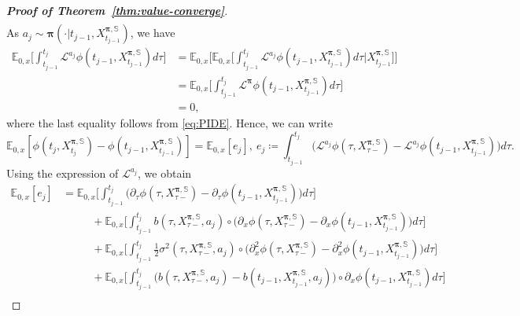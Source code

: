 \documentclass[11pt]{article}
\newcommand{\1}{\mathbbm{1}}
\newcommand{\bpi}{\boldsymbol{\pi}}
\begin{document}
\begin{proof}[\bf Proof of Theorem~\ref{thm:value-converge}]
\begin{align*}
\end{align*}
As $a_j\sim\bpi(\cdot|t_{j-1}, X^{\bpi, \mathbb{S}}_{t_{j-1}})$, we have
\begin{align}
	\mathbb{E}_{0,x}\Big[\int_{t_{j-1}}^{t_j}\mathcal{L}^{a_j}\phi(t_{j-1}, X_{t_{j-1}}^{\bpi, \mathbb{S}})d\tau\Big] &= \mathbb{E}_{0,x}\Big[\mathbb{E}_{0,x}\Big[\int_{t_{j-1}}^{t_j}\mathcal{L}^{a_j}\phi(t_{j-1}, X_{t_{j-1}}^{\bpi, \mathbb{S}})d\tau\Big|X_{t_{j-1}}^{\bpi, \mathbb{S}}\Big]\Big]\\
	&= \mathbb{E}_{0,x}\Big[\int_{t_{j-1}}^{t_j}\mathcal{L}^{\bpi} \phi(t_{j-1}, X_{t_{j-1}}^{\bpi,\mathbb{S}})d\tau\Big]\\
	&=0,
\end{align}
where the last equality follows from \eqref{eq:PIDE}. Hence, we can write
\begin{equation}
 \mathbb{E}_{0,x}[\phi(t_j, X_{t_j}^{\bpi , \mathbb{S}}) - \phi(t_{j-1}, X_{t_{j-1}}^{\bpi, \mathbb{S}})] =  \mathbb{E}_{0,x}[e_j],\  e_j\coloneqq\int_{t_{j-1}}^{t_j}
 \big(\mathcal{L}^{a_j} \phi(\tau , X_{\tau-}^{\bpi, \mathbb{S}}) -  \mathcal{L}^{a_j} \phi(t_{j-1}, X_{t_{j-1}}^{\bpi, \mathbb{S}})\big)d\tau.
\end{equation}
Using the expression of $\mathcal{L}^{a_j}$, we obtain
\begin{align}
\mathbb{E}_{0,x}[e_j]&=\mathbb{E}_{0,x}\Big[\int_{t_{j-1}}^{t_j}\big(\partial_{\tau}\phi(\tau, X_{\tau-}^{\bpi, \mathbb{S}})-\partial_{\tau}\phi(t_{j-1}, X_{t_{j-1}}^{\bpi, \mathbb{S}})\big)d\tau\Big]\\
&\phantom{==}+\mathbb{E}_{0,x}\Big[\int_{t_{j-1}}^{t_j}b(\tau, X_{\tau-}^{\bpi, \mathbb{S}}, a_{j})\circ\big(\partial_{x}\phi(\tau, X_{\tau-}^{\bpi, \mathbb{S}})-\partial_{x}\phi(t_{j-1}, X_{t_{j-1}}^{\bpi, \mathbb{S}})\big)d\tau\Big]\\
&\phantom{==}+\mathbb{E}_{0,x}\Big[\int_{t_{j-1}}^{t_j}\frac{1}{2}\sigma^2(\tau, X_{\tau-}^{\bpi, \mathbb{S}}, a_{j})\circ\big(\partial_x^2\phi(\tau, X_{\tau-}^{\bpi, \mathbb{S}})-\partial_x^2\phi(t_{j-1}, X_{t_{j-1}}^{\bpi, \mathbb{S}})\big)d\tau\Big]\\
&\phantom{==}+\mathbb{E}_{0,x}\Big[\int_{t_{j-1}}^{t_j}\big(b(\tau, X_{\tau-}^{\bpi, \mathbb{S}}, a_{j})-b(t_{j-1}, X_{t_{j-1}}^{\bpi, \mathbb{S}}, a_{j})\big)\circ\partial_{x}\phi(t_{j-1}, X_{t_{j-1}}^{\bpi, \mathbb{S}})d\tau\Big]\\

\end{align}
\end{proof}
\end{document}
